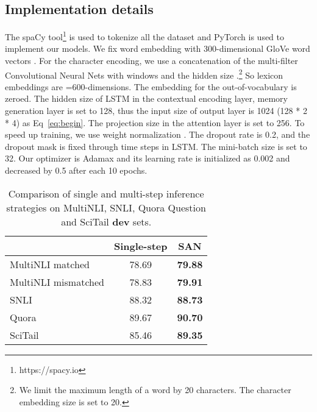 \documentclass[11pt,a4paper]{article}
\begin{document}
\subsection{Implementation details}
\label{sec:imp}
The spaCy tool\footnote{https://spacy.io} is used to tokenize all the dataset and PyTorch is used to implement our models. We fix word embedding with 300-dimensional GloVe word vectors \cite{pennington2014glove}. For the character encoding, we use a concatenation of the multi-filter Convolutional Neural Nets with windows  and the hidden size .\footnote{We limit the maximum length of a word by 20 characters. The character embedding size is set to 20.} So lexicon embeddings are =600-dimensions. The embedding for the out-of-vocabulary is zeroed. The hidden size of LSTM in the contextual encoding layer, memory generation layer is set to 128, thus the input size of output layer is 1024 (128 * 2 * 4) as Eq~\ref{eq:begin}. The projection size in the attention layer is set to 256. To speed up training, we use weight normalization \cite{salimans2016weight}. The dropout rate is 0.2, and the dropout mask is fixed through time steps \cite{gal2016theoretically} in LSTM. The mini-batch size is set to 32. Our optimizer is Adamax \cite{kingma2014adam} and its learning rate is initialized as 0.002 and decreased by 0.5 after each 10 epochs.



\begin{table}[t!]
\centering
\begin{tabular}{@{\hskip1pt}l || c | c  }
\hline
 & Single-step & SAN \\\hline
MultiNLI matched & 78.69 & \textbf{79.88} \\
MultiNLI mismatched & 78.83 & \textbf{79.91} \\ \hline 
SNLI & 88.32 & \textbf{88.73} \\ \hline
Quora & 89.67 & \textbf{90.70} \\ \hline
SciTail &85.46  & \textbf{89.35} \\ \hline
\end{tabular}
\caption{\label{tab:main} Comparison of single and multi-step inference strategies on MultiNLI, SNLI, Quora Question and SciTail \textbf{dev} sets.}
\end{table}
\end{document}
